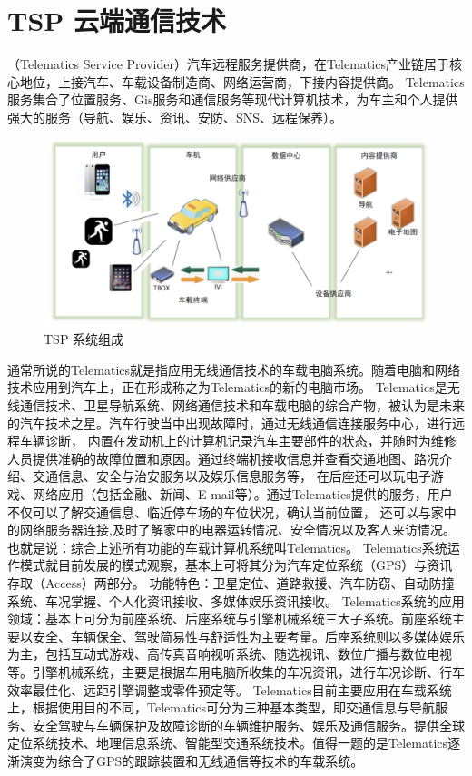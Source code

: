 \section{TSP 云端通信技术}

（Telematics Service Provider）汽车远程服务提供商，在Telematics产业链居于核心地位，上接汽车、车载设备制造商、网络运营商，下接内容提供商。
 Telematics服务集合了位置服务、Gis服务和通信服务等现代计算机技术，为车主和个人提供强大的服务（导航、娱乐、资讯、安防、SNS、远程保养）。
 \begin{figure}
    \centering
    \includegraphics[scale=0.6]{resources/img/i2.png}
    \caption{TSP 系统组成}
  \end{figure}
\newline
通常所说的Telematics就是指应用无线通信技术的车载电脑系统。随着电脑和网络技术应用到汽车上，正在形成称之为Telematics的新的电脑市场。
Telematics是无线通信技术、卫星导航系统、网络通信技术和车载电脑的综合产物，被认为是未来的汽车技术之星。汽车行驶当中出现故障时，通过无线通信连接服务中心，进行远程车辆诊断，
内置在发动机上的计算机记录汽车主要部件的状态，并随时为维修人员提供准确的故障位置和原因。通过终端机接收信息并查看交通地图、路况介绍、交通信息、安全与治安服务以及娱乐信息服务等，
在后座还可以玩电子游戏、网络应用（包括金融、新闻、E-mail等）。通过Telematics提供的服务，用户不仅可以了解交通信息、临近停车场的车位状况，确认当前位置，
还可以与家中的网络服务器连接,及时了解家中的电器运转情况、安全情况以及客人来访情况。也就是说：综合上述所有功能的车载计算机系统叫Telematics。
Telematics系统运作模式就目前发展的模式观察，基本上可将其分为汽车定位系统（GPS）与资讯存取（Access）两部分。
功能特色：卫星定位、道路救援、汽车防窃、自动防撞系统、车况掌握、个人化资讯接收、多媒体娱乐资讯接收。
\newline
Telematics系统的应用领域：基本上可分为前座系统、后座系统与引擎机械系统三大子系统。前座系统主要以安全、车辆保全、驾驶简易性与舒适性为主要考量。后座系统则以多媒体娱乐为主，包括互动式游戏、高传真音响视听系统、随选视讯、数位广播与数位电视等。引擎机械系统，主要是根据车用电脑所收集的车况资讯，进行车况诊断、行车效率最佳化、远距引擎调整或零件预定等。
\newline
Telematics目前主要应用在车载系统上，根据使用目的不同，Telematics可分为三种基本类型，即交通信息与导航服务、安全驾驶与车辆保护及故障诊断的车辆维护服务、娱乐及通信服务。提供全球定位系统技术、地理信息系统、智能型交通系统技术。值得一题的是Telematics逐渐演变为综合了GPS的跟踪装置和无线通信等技术的车载系统。

